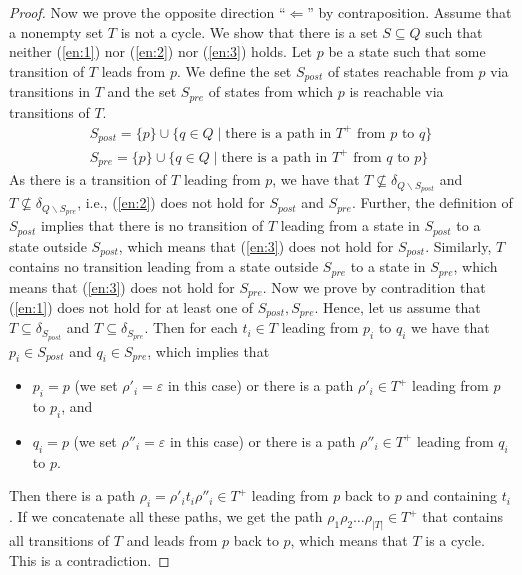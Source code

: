 \documentclass[a4paper,UKenglish,cleveref,autoref,thm-restate]{lipics-v2021}
\newcommand{\pre}{{S_\mathit{pre}}}
\newcommand{\post}{{S_\mathit{post}}}
\begin{document}
\begin{proof}
  Now we prove the opposite direction ``$\Longleftarrow$'' by
  contraposition. Assume that a nonempty set $T$ is not a cycle. We
  show that there is a set $S\subseteq Q$ such that neither
  (\ref{en:1}) nor (\ref{en:2}) nor (\ref{en:3}) holds. Let $p$ be a
  state such that some transition of $T$ leads from $p$. We define the
  set $\post$ of states reachable from $p$ via transitions in $T$ and the set
  $\pre$ of states from which $p$ is reachable via transitions of $T$.
  \[
    \begin{array}{r}
    \post=\{p\}\cup\{q\in Q\mid \textrm{there is a path in }T^+\textrm{ from }p\textrm{ to }q\}\\[.5ex]
    \pre=\{p\}\cup\{q\in Q\mid \textrm{there is a path in }T^+\textrm{ from }q\textrm{ to }p\}
    \end{array}
  \]  
  As there is a transition of $T$ leading from $p$, we have that
  $T\not\subseteq\delta_{Q\smallsetminus\post}$ and
  $T\not\subseteq\delta_{Q\smallsetminus\pre}$, i.e., (\ref{en:2})
  does not hold for $\post$ and $\pre$. Further, the definition of
  $\post$ implies that there is no transition of $T$ leading from a
  state in $\post$ to a state outside $\post$, which means that
  (\ref{en:3}) does not hold for $\post$. Similarly, $T$ contains no
  transition leading from a state outside $\pre$ to a state in $\pre$,
  which means that (\ref{en:3}) does not hold for $\pre$. Now we prove
  by contradition that (\ref{en:1}) does not hold for at least one of
  $\post,\pre$. Hence, let us assume that $T\subseteq\delta_\post$ and
  $T\subseteq\delta_\pre$. Then for each $t_i\in T$ leading from $p_i$
  to $q_i$ we have that $p_i\in\post$ and $q_i\in\pre$, which implies
  that
  \begin{itemize}
  \item $p_i=p$ (we set $\rho'_i=\varepsilon$ in this case) or
    there is a path $\rho'_i\in T^+$ leading from $p$ to $p_i$, and
  \item $q_i=p$ (we set $\rho''_i=\varepsilon$ in this case) or
    there is a path $\rho''_i\in T^+$ leading from $q_i$ to $p$.
  \end{itemize}
  Then there is a path $\rho_i=\rho'_it_i\rho''_i\in T^+$ leading from
  $p$ back to $p$ and containing $t_i$. If we concatenate all these
  paths, we get the path $\rho_1\rho_2\ldots\rho_{|T|}\in T^+$ that
  contains all transitions of $T$ and leads from $p$ back to $p$,
  which means that $T$ is a cycle.  This is a contradiction.%
\end{proof}
\end{document}
